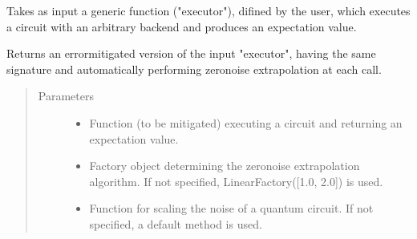 \documentclass[letterpaper,10pt,english]{sphinxmanual}
\begin{document}
\begin{fulllineitems}
\label{\detokenize{apidoc:mitiq.zne.mitigate_executor}}
Takes as input a generic function ("executor"), difined by the user, which executes a circuit
with an arbitrary backend and produces an expectation value.

Returns an error\sphinxhyphen{}mitigated version of the input "executor", having the same signature and
automatically performing zero\sphinxhyphen{}noise extrapolation at each call.
\begin{quote}\begin{description}
\item[{Parameters}] \leavevmode\begin{itemize}
\item {} 
 \sphinxhyphen{}\sphinxhyphen{} Function (to be mitigated) executing a circuit and returning an expectation value.

\item {} 
 \sphinxhyphen{}\sphinxhyphen{} Factory object determining the zero\sphinxhyphen{}noise extrapolation algorithm.
If not specified, LinearFactory({[}1.0, 2.0{]}) is used.

\item {} 
 \sphinxhyphen{}\sphinxhyphen{} Function for scaling the noise of a quantum circuit.
If not specified, a default method is used.

\end{itemize}

\end{description}\end{quote}

\end{fulllineitems}

\end{document}
